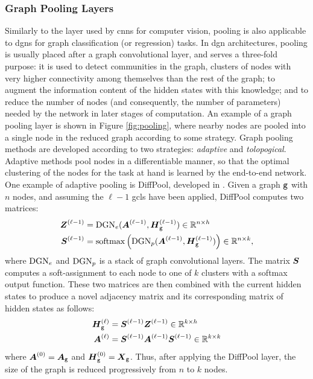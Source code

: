 \subsubsection*{Graph Pooling Layers}\label{sec:pooling}
Similarly to the layer used by \glspl{cnn} for computer vision, pooling is also applicable to \glspl{dgn} for graph classification (or regression) tasks. In \gls{dgn} architectures, pooling is usually placed after a graph convolutional layer, and serves a three-fold purpose: it is used to detect communities in the graph, \ie clusters of nodes with very higher connectivity among themselves than the rest of the graph; to augment the information content of the hidden states with this knowledge; and to reduce the number of nodes (and consequently, the number of parameters) needed by the network in later stages of computation. An example of a graph pooling layer is shown in Figure \ref{fig:pooling}, where nearby nodes are pooled into a single node in the reduced graph according to some strategy. Graph pooling methods are developed according to two strategies: \emph{adaptive} and \emph{tolopogical}. Adaptive methods pool nodes in a differentiable manner, so that the optimal clustering of the nodes for the task at hand is learned by the end-to-end network. One example of adaptive pooling is DiffPool, developed in \citep{ying2018diffpool}. Given a graph $\mathtt{g}$ with $n$ nodes, and assuming the $\ell-1$ \glspl{gcl} have been applied, DiffPool computes two matrices:
\begin{align*}
    \GenGraphLayerMat{z}{\ell-1} &= \Fun{DGN}_e(\LayerAdjMat{\ell-1},\LayerStateMat{g}{\ell-1}) \in \Real^{n \times h}\\
    \GenGraphLayerMat{s}{\ell-1} &= \softmax\Par{\Fun{DGN}_p(\LayerAdjMat{\ell-1},\LayerStateMat{g}{\ell-1})} \in \Real^{n \times k},
\end{align*}
where $\mathrm{DGN}_e$ and $\mathrm{DGN}_p$ is a stack of graph convolutional layers. The matrix $\Matrix{S}$ computes a soft-assignment to each node to one of $k$ clusters with a softmax output function. These two matrices are then combined with the current hidden states to produce a novel adjacency matrix and its corresponding matrix of hidden states as follows:
\begin{align*}
    \LayerStateMat{g}{\ell} &= \GenGraphLayerMat{s}{\ell-1}\GenGraphLayerMat{z}{\ell-1} \in \Real^{k \times h}\\
    \LayerAdjMat{\ell} &= \GenGraphLayerMat{s}{\ell-1}\LayerAdjMat{\ell-1}\GenGraphLayerMat{s}{\ell-1} \in \Real^{k \times k}
\end{align*}
where $\LayerAdjMat{0} = \AdjMatrix{g}$ and $\LayerStateMat{g}{0} = \FeatureMatrix{g}$. Thus, after applying the DiffPool layer, the size of the graph is reduced progressively from $n$ to $k$ nodes.

